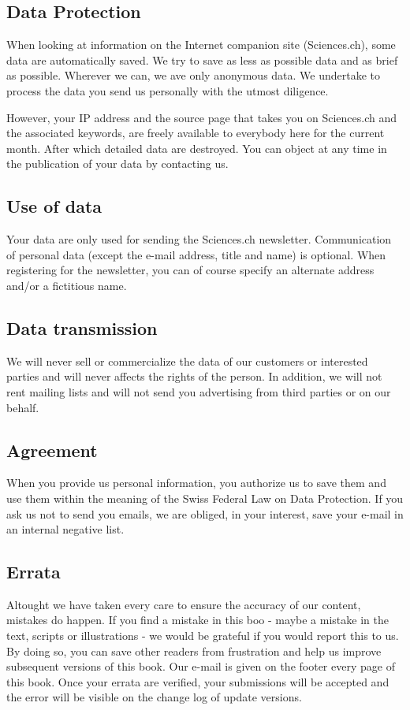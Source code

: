 	\pagebreak
	\subsection{Data Protection}
	When looking at information on the Internet companion site (Sciences.ch), some data are automatically saved. We try to save as less as possible data and as brief as possible. Wherever we can, we ave only anonymous data. We undertake to process the data you send us personally with the utmost diligence.

	However, your IP address and the source page that takes you on Sciences.ch and the associated keywords, are freely available to everybody here for the current month. After which detailed data are destroyed. You can object at any time in the publication of your data by contacting us.

	\subsection{Use of data}

	Your data are only used for sending the Sciences.ch newsletter. Communication of personal data (except the e-mail address, title and name) is optional. When registering for the newsletter, you can of course specify an alternate address and/or a fictitious name.

	\subsection{Data transmission}

	We will never sell or commercialize the data of our customers or interested parties and will never affects the rights of the person. In addition, we will not rent mailing lists and will not send you advertising from third parties or on our behalf.

	\subsection{Agreement}

	When you provide us personal information, you authorize us to save them and use them within the meaning of the Swiss Federal Law on Data Protection. If you ask us not to send you emails, we are obliged, in your interest, save your e-mail in an internal negative list.
	
	\subsection{Errata}
	Altought we have taken every care to ensure the accuracy of our content, mistakes do happen. If you find a mistake in this boo - maybe a mistake in the text, scripts or illustrations - we would be grateful if you would report this to us. By doing so, you can save other readers from frustration and help us improve subsequent versions of this book. Our e-mail is given on the footer every page of this book. Once your errata are verified, your submissions will be accepted and the error will be visible on the change log of update versions.

